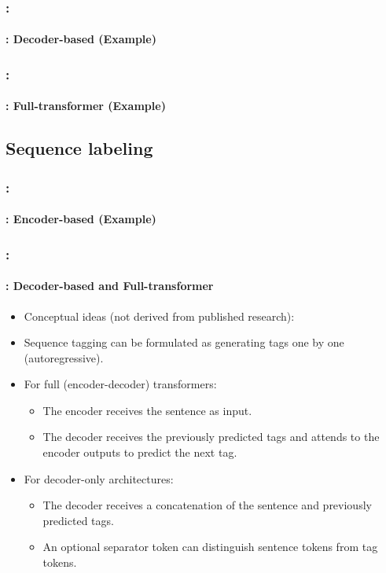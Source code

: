 \documentclass[xcolor=table]{beamer}
\begin{document}
\begin{frame}
	\frametitle{\insertshortsubtitle: \insertsection}
	\framesubtitle{\insertsubsection: Decoder-based (Example)}
	
	
\end{frame}

\begin{frame}
	\frametitle{\insertshortsubtitle: \insertsection}
	\framesubtitle{\insertsubsection: Full-transformer (Example)}
	
	
\end{frame}


\subsection{Sequence labeling}

\begin{frame}
	\frametitle{\insertshortsubtitle: \insertsection}
	\framesubtitle{\insertsubsection: Encoder-based (Example)}
	
	\begin{center}
	\end{center}
	
\end{frame}

\begin{frame}
	\frametitle{\insertshortsubtitle: \insertsection}
	\framesubtitle{\insertsubsection: Decoder-based and Full-transformer}
	
	\begin{itemize}
		\item Conceptual ideas (not derived from published research):
		\item Sequence tagging can be formulated as generating tags one by one (autoregressive).
		\item For full (encoder-decoder) transformers:
		\begin{itemize}
			\item The encoder receives the sentence as input.
			\item The decoder receives the previously predicted tags and attends to the encoder outputs to predict the next tag.
		\end{itemize}
		\item For decoder-only architectures:
		\begin{itemize}
			\item The decoder receives a concatenation of the sentence and previously predicted tags.
			\item An optional separator token can distinguish sentence tokens from tag tokens.
		\end{itemize}
	\end{itemize}
	
	
\end{frame}
\end{document}
